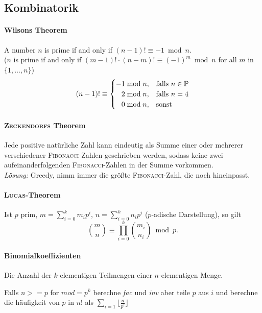 \subsection{Kombinatorik}

\paragraph{Wilsons Theorem}
A number $n$ is prime if and only if
$(n-1)!\equiv -1\bmod{n}$.\\
($n$ is prime if and only if $(m-1)!\cdot(n-m)!\equiv(-1)^m\bmod{n}$ for all $m$ in $\{1,\dots,n\}$)
\begin{align*}
	(n-1)!\equiv\begin{cases}
		-1\bmod{n},&\mathrm{falls}~n \in \mathbb{P}\\
		\hphantom{-}2\bmod{n},&\mathrm{falls}~n = 4\\
		\hphantom{-}0\bmod{n},&\mathrm{sonst}
	\end{cases}
\end{align*}

\paragraph{\textsc{Zeckendorfs} Theorem}
Jede positive natürliche Zahl kann eindeutig als Summe einer oder mehrerer
verschiedener \textsc{Fibonacci}-Zahlen geschrieben werden, sodass keine zwei
aufeinanderfolgenden \textsc{Fibonacci}-Zahlen in der Summe vorkommen.\\
\emph{Lösung:} Greedy, nimm immer die größte \textsc{Fibonacci}-Zahl, die noch
hineinpasst.

\paragraph{\textsc{Lucas}-Theorem}
Ist $p$ prim, $m=\sum_{i=0}^km_ip^i$, $n=\sum_{i=0}^kn_ip^i$ ($p$-adische Darstellung),
so gilt
\vspace{-0.75\baselineskip}
\[
	\binom{m}{n} \equiv \prod_{i=0}^k\binom{m_i}{n_i} \bmod{p}.
\]

\paragraph{Binomialkoeffizienten}
	Die Anzahl der \mbox{$k$-elementigen} Teilmengen einer \mbox{$n$-elementigen} Menge.
	\begin{methods}
	\end{methods}
	Falls $n >= p$ for $\mathit{mod}=p^k$ berechne \textit{fac} und \textit{inv} aber teile $p$ aus $i$ und berechne die häufigkeit von $p$ in $n!$ als $\sum\limits_{i=1}\big\lfloor\frac{n}{p^i}\big\rfloor$
\columnbreak
	
